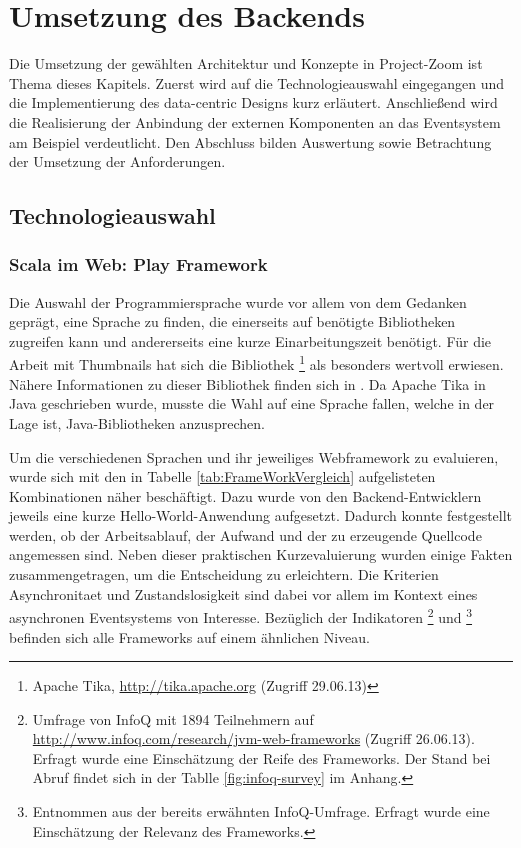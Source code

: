 \chapter{Umsetzung des Backends}

Die Umsetzung der gewählten Architektur und Konzepte in Project-Zoom ist Thema dieses Kapitels. Zuerst wird auf die Technologieauswahl eingegangen und die Implementierung des data-centric Designs kurz erläutert. Anschließend wird die Realisierung der Anbindung der externen Komponenten an das \gls{Eventsystem} am Beispiel verdeutlicht. Den Abschluss bilden Auswertung sowie Betrachtung der Umsetzung der Anforderungen. 

\section{Technologieauswahl}

\subsection{Scala im Web: Play \gls{Framework}}
Die Auswahl der Programmiersprache wurde vor allem von dem Gedanken geprägt, eine Sprache zu finden, die einerseits auf benötigte Bibliotheken zugreifen kann und andererseits eine kurze Einarbeitungszeit benötigt. Für die Arbeit mit \gls{Thumbnail}s hat sich die Bibliothek \footnote{Apache Tika, \url{http://tika.apache.org} (Zugriff 29.06.13)} als besonders wertvoll erwiesen. Nähere Informationen zu dieser Bibliothek finden sich in \cite{bp-dome}. Da Apache Tika in Java geschrieben wurde, musste die Wahl auf eine Sprache fallen, welche in der Lage ist, Java-Bibliotheken anzusprechen. 

Um die verschiedenen Sprachen und ihr jeweiliges Webframework zu evaluieren, wurde sich mit den in Tabelle \ref{tab:FrameWorkVergleich} aufgelisteten Kombinationen näher beschäftigt. Dazu wurde von den \gls{Backend}-Entwicklern jeweils eine kurze Hello-World-Anwendung aufgesetzt. Dadurch konnte festgestellt werden, ob der Arbeitsablauf, der Aufwand und der zu erzeugende Quellcode angemessen sind. Neben dieser praktischen Kurzevaluierung wurden einige Fakten zusammengetragen, um die Entscheidung zu erleichtern. Die Kriterien \gls{Asynchronitaet} und Zustandslosigkeit sind dabei vor allem im Kontext eines asynchronen \gls{Eventsystem}s von Interesse. Bezüglich der Indikatoren \footnote{Umfrage von InfoQ mit 1894 Teilnehmern auf \url{http://www.infoq.com/research/jvm-web-frameworks} (Zugriff 26.06.13). Erfragt wurde eine Einschätzung der Reife des \gls{Framework}s. Der Stand bei Abruf findet sich in der Tablle \ref{fig:infoq-survey} im Anhang.} und \footnote{Entnommen aus der bereits erwähnten InfoQ-Umfrage. Erfragt wurde eine Einschätzung der Relevanz des \gls{Framework}s.} befinden sich alle \gls{Framework}s auf einem ähnlichen Niveau. 

